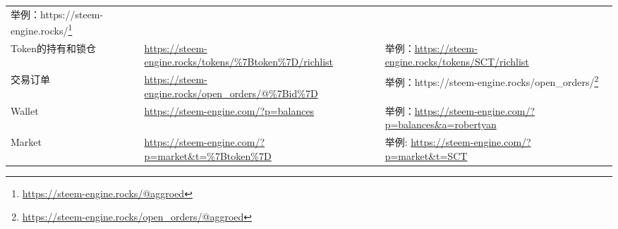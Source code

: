 \documentclass[]{ctexbook}
\renewcommand{\href}[2]{#2\footnote{\url{#1}}}
\begin{document}
\begin{longtable}[]{@{}lll@{}}
\begin{minipage}[t]{0.30\columnwidth}
举例：\href{https://steem-engine.rocks/@aggroed}{https://steem-engine.rocks/\citet{aggroed}}\strut
\end{minipage}\tabularnewline
\begin{minipage}[t]{0.30\columnwidth}\raggedright
Token的持有和锁仓\strut
\end{minipage} & \begin{minipage}[t]{0.30\columnwidth}\raggedright
\url{https://steem-engine.rocks/tokens/\%7Btoken\%7D/richlist}\strut
\end{minipage} & \begin{minipage}[t]{0.30\columnwidth}\raggedright
举例：\url{https://steem-engine.rocks/tokens/SCT/richlist}\strut
\end{minipage}\tabularnewline
\begin{minipage}[t]{0.30\columnwidth}\raggedright
交易订单\strut
\end{minipage} & \begin{minipage}[t]{0.30\columnwidth}\raggedright
\url{https://steem-engine.rocks/open_orders/@\%7Bid\%7D}\strut
\end{minipage} & \begin{minipage}[t]{0.30\columnwidth}\raggedright
举例：\href{https://steem-engine.rocks/open_orders/@aggroed}{https://steem-engine.rocks/open\_orders/\citet{aggroed}}\strut
\end{minipage}\tabularnewline
\begin{minipage}[t]{0.30\columnwidth}\raggedright
Wallet\strut
\end{minipage} & \begin{minipage}[t]{0.30\columnwidth}\raggedright
\url{https://steem-engine.com/?p=balances}\strut
\end{minipage} & \begin{minipage}[t]{0.30\columnwidth}\raggedright
举例：\url{https://steem-engine.com/?p=balances\&a=robertyan}\strut
\end{minipage}\tabularnewline
\begin{minipage}[t]{0.30\columnwidth}\raggedright
Market\strut
\end{minipage} & \begin{minipage}[t]{0.30\columnwidth}\raggedright
\url{https://steem-engine.com/?p=market\&t=\%7Btoken\%7D}\strut
\end{minipage} & \begin{minipage}[t]{0.30\columnwidth}\raggedright
举例: \url{https://steem-engine.com/?p=market\&t=SCT}\strut
\end{minipage}\tabularnewline

\end{longtable}
\end{document}
